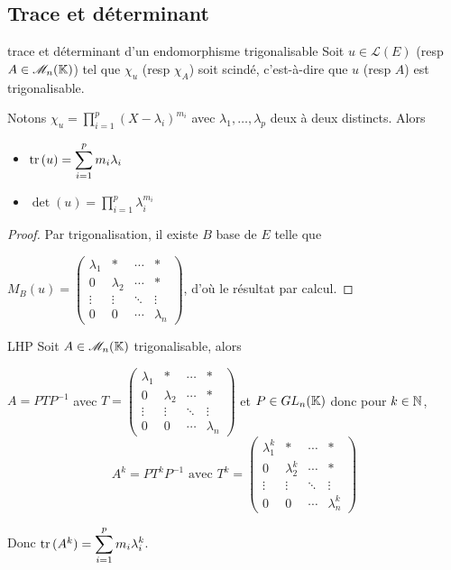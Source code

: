 \subsection{Trace et déterminant }

\begin{proposition}{trace et déterminant d'un endomorphisme trigonalisable}{}
    Soit $u \in \mathscr L(E)$ (resp $A \in \mathscr M_n(\mathbb{K})$) tel que $\chi_u$ (resp $\chi_A$) soit scindé, 
    c'est-à-dire que $u$ (resp $A$) est trigonalisable.

    Notons $\displaystyle \chi_u = \prod_{i = 1 }^{ p } (X - \lambda_i)^{m_i}$ avec $\lambda_1, \ldots, \lambda_p$ 
    deux à deux distincts. Alors 
    \begin{itemize}
        \item $\operatorname{tr} \,(u) = \displaystyle \sum_{i = 1 }^{ p } m_i \lambda_i$
        \item $\det(u) = \displaystyle \prod_{i = 1 }^{ p } \lambda_i^{m_i}$
    \end{itemize}
\end{proposition}

\begin{proof}
    Par trigonalisation, il existe $B$ base de $E$ telle que 

    $M_B(u) = \begin{pmatrix}
        \lambda_1 & * & \cdots & * \\
        0 & \lambda_2 & \cdots & * \\
        \vdots & \vdots & \ddots & \vdots \\
        0 & 0 & \cdots & \lambda_n
    \end{pmatrix}$, d'où le résultat par calcul. 
\end{proof}

\begin{corollaire}{LHP}{}
    Soit $A \in \mathscr M_n(\mathbb{K})$ trigonalisable, alors 

    $A = PTP^{-1}$ avec $T = \begin{pmatrix}
        \lambda_1 & * & \cdots & * \\
        0 & \lambda_2 & \cdots & * \\
        \vdots & \vdots & \ddots & \vdots \\
        0 & 0 & \cdots & \lambda_n
    \end{pmatrix}$ et $P \in GL_n(\mathbb{K})$
    donc pour $k \in \mathbb{N}$, 
    $$A^k = P T^k P^{-1} \text{ avec } T^k = \begin{pmatrix}
        \lambda_1^k & * & \cdots & * \\
        0 & \lambda_2^k & \cdots & * \\
        \vdots & \vdots & \ddots & \vdots \\
        0 & 0 & \cdots & \lambda_n^k
    \end{pmatrix}$$

    Donc $\operatorname{tr} \,(A^k) = \displaystyle \sum_{i = 1 }^{ p } m_i\lambda_i^k$.
\end{corollaire}

